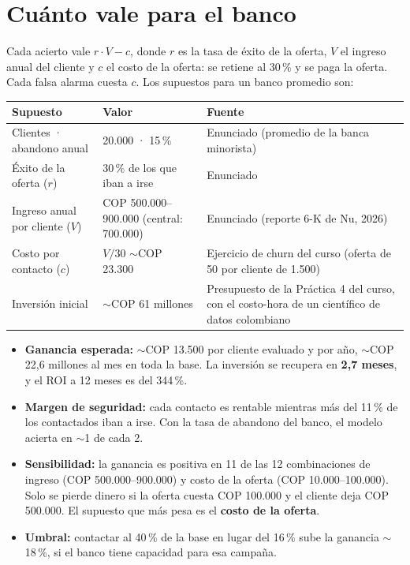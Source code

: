 \documentclass[11pt,a4paper]{article}
\renewcommand{\arraystretch}{1.3}
\newcommand{\apx}{\ensuremath{\sim}}                     %
\begin{document}
\section{Cuánto vale para el banco}

Cada acierto vale $r \cdot V - c$, donde $r$ es la tasa de éxito de la oferta, $V$ el ingreso anual del cliente y
$c$ el costo de la oferta: se retiene al 30\,\% y se paga la oferta. Cada falsa alarma cuesta $c$. Los supuestos
para un banco promedio son:

{\small\renewcommand{\arraystretch}{1.15}
\begin{tabularx}{\linewidth}{@{}>{\raggedright}p{4.4cm} >{\raggedright}p{4.3cm} >{\raggedright\arraybackslash}X@{}}
\toprule
\textbf{Supuesto} & \textbf{Valor} & \textbf{Fuente} \\
\midrule
Clientes · abandono anual & 20.000 · 15\,\% & Enunciado (promedio de la banca minorista) \\
Éxito de la oferta ($r$) & 30\,\% de los que iban a irse & Enunciado \\
Ingreso anual por cliente ($V$) & COP 500.000--900.000 (central: 700.000) & Enunciado (reporte 6-K de Nu, 2026) \\
Costo por contacto ($c$) & $V/30$ \apx COP 23.300 & Ejercicio de churn del curso (oferta de 50 por cliente de
  1.500) \\
Inversión inicial & \apx COP 61 millones & Presupuesto de la Práctica 4 del curso, con el costo-hora de un
  científico de datos colombiano \\
\bottomrule
\end{tabularx}}

\begin{itemize}
  \item \textbf{Ganancia esperada:} \apx COP 13.500 por cliente evaluado y por año, \apx COP 22,6 millones al mes en
    toda la base. La inversión se recupera en \textbf{2,7 meses}, y el ROI a 12 meses es del 344\,\%.
  \item \textbf{Margen de seguridad:} cada contacto es rentable mientras más del 11\,\% de los contactados iban a
    irse. Con la tasa de abandono del banco, el modelo acierta en \apx1 de cada 2.
  \item \textbf{Sensibilidad:} la ganancia es positiva en 11 de las 12 combinaciones de ingreso (COP 500.000--900.000)
    y costo de la oferta (COP 10.000--100.000). Solo se pierde dinero si la oferta cuesta COP 100.000 y el cliente
    deja COP 500.000. El supuesto que más pesa es el \textbf{costo de la oferta}.
  \item \textbf{Umbral:} contactar al 40\,\% de la base en lugar del 16\,\% sube la ganancia \apx18\,\%, si el
    banco tiene capacidad para esa campaña.
\end{itemize}
\end{document}
